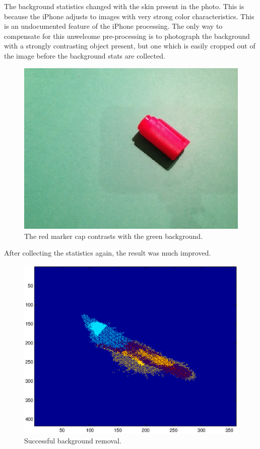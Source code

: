The background statistics changed with the skin present in the photo. This is because the iPhone adjusts to images with very strong color characteristics. This is an undocumented feature of the iPhone processing. The only way to compensate for this unwelcome pre-processing is to photograph the background with a strongly contrasting object present, but one which is easily cropped out of the image before the background stats are collected.

\begin{figure}[h!]
  \caption{The red marker cap contrasts with the green background.}
  \label{fig:BGCap}
  \centering
    \includegraphics[width=\textwidth]{Chapter2/Figs/bg_cap.eps}
\end{figure}

After collecting the statistics again, the result was much improved.

\begin{figure}[h!]
  \caption{Successful background removal.}
  \label{fig:BGSuccess}
  \centering
    \includegraphics[width=\textwidth]{Chapter2/Figs/xy_bg_success.eps}
\end{figure}

